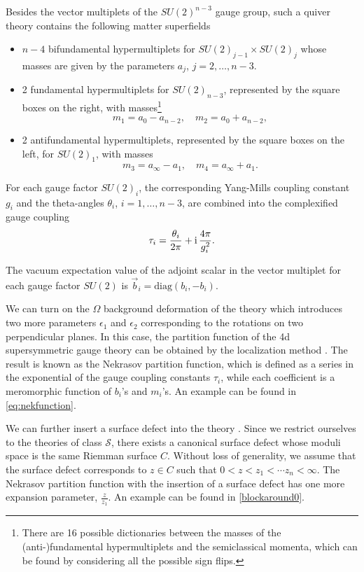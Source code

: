 \documentclass[11pt]{article}
\numberwithin{equation}{section}
\newcommand{\ri}{{\rm i}}
\begin{document}
Besides the vector multiplets  of the $SU(2)^{n-3}$ gauge group, such a quiver theory contains the following matter superfields
\begin{itemize}
\item $n-4$ bifundamental hypermultiplets for $SU(2)_{j-1}\times SU(2)_{j}$ whose masses are given by the parameters $a_{j}$, $j=2,\dots,n-3$. 
\item 2 fundamental hypermultiplets for $SU(2)_{n-3}$, represented by the square boxes on the right, with masses\footnote{There are 16 possible dictionaries between the masses of the (anti-)fundamental hypermultiplets and the semiclassical momenta, which can be found by considering all the possible sign flips. }
\begin{equation}
m_1=a_0-a_{n-2},\quad m_2=a_0+a_{n-2},
\end{equation}
\item 2 antifundamental hypermultiplets, represented by the square boxes on the left, for $SU(2)_1$, with masses 
\begin{equation}
m_3=a_{\infty}-a_{1},\quad m_4=a_{\infty}+a_{1}.
\end{equation}
\end{itemize}
%
%
For each gauge factor $SU(2)_i$, the corresponding Yang-Mills coupling constant $g_i$ and the theta-angles $\theta_i$, $i=1,\dots,n-3$, are combined into the complexified gauge coupling
\begin{equation}
\tau_i=\frac{\theta_i}{2\pi}+\ri\,\frac{4\pi}{g_i^2}.
\end{equation}


The vacuum expectation value of the adjoint scalar in the vector multiplet for each gauge factor $SU(2)$ is 
%
$\vec{b}_i=\mathrm{diag}(b_{i},-b_{i})$.

We can turn on the $\Omega$ background deformation of the theory which introduces two more parameters $\epsilon_1$ and $\epsilon_2$ corresponding to the rotations on two perpendicular planes. In this case, the partition function of the 4d supersymmetric gauge theory can be obtained by the localization method \cite{Moore:1997dj,Lossev:1997bz,Nekrasov:2002qd,no2}. The result is known as the Nekrasov partition function, which is defined as a series in the exponential of the gauge coupling constants $\tau_i$, while each coefficient is a meromorphic function of $b_i$'s and $m_i$'s.  An
example can be found in \eqref{eq:nekfunction}.

We can further insert a surface defect into the theory \cite{Alday:2010vg,Gaiotto:2014ina,Kanno:2011fw,Gaiotto:2009hg,Jeong:2021rll,Jeong:2023qdr,Jeong:2018qpc,Jeong:2017pai,Piatek:2017fyn,Alday:2009fs,Drukker:2009id}. Since we restrict ourselves to the theories of class $\mathcal{S}$, there exists a canonical surface defect whose moduli space is the same Riemman surface $C$. Without loss of generality, we assume that the surface defect corresponds to $z\in C$ such that $0<z<z_1<\cdots z_n<\infty$. The Nekrasov partition function with the insertion of a surface defect has one more expansion parameter, $\frac{z}{z_1}$. An example can be found in \eqref{blockaround0}. 
\end{document}
